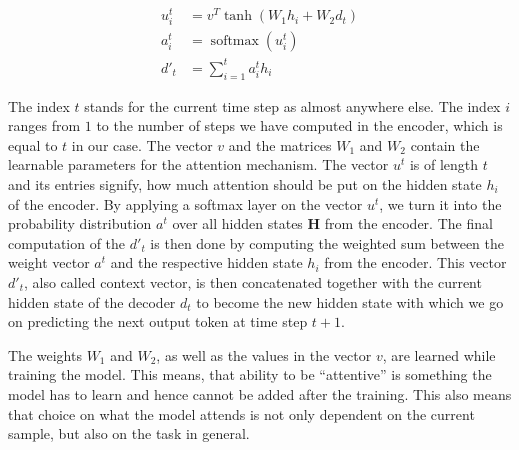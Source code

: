 \begin{equation}
\label{fundamentals:attention:equations}
\begin{split}
	u^t_i & = v^T \tanh(W_1 h_i + W_2 d_t) \\
	a^t_i & = \operatorname{softmax}(u^t_i) \\
	d'_t & = \sum_{i=1}^{t} a^t_i h_i
\end{split}
\end{equation}

The index $t$ stands for the current time step as almost anywhere else. The index $i$ ranges from $1$ to the number of steps we have computed in the encoder, which is equal to $t$ in our case. The vector $v$ and the matrices $W_1$ and $W_2$ contain the learnable parameters for the attention mechanism. The vector $u^t$ is of length $t$ and its entries signify, how much attention should be put on the hidden state $h_i$ of the encoder. By applying a softmax layer on the vector $u^t$, we turn it into the probability distribution $a^t$ over all hidden states $\mathbf{H}$ from the encoder. The final computation of the $d'_t$ is then done by computing the weighted sum between the weight vector $a^t$ and the respective hidden state $h_i$ from the encoder. This vector $d'_t$, also called context vector, is then concatenated together with the current hidden state of the decoder $d_t$ to become the new hidden state with which we go on predicting the next output token at time step $t+1$.

The weights $W_1$ and $W_2$, as well as the values in the vector $v$, are learned while training the model. This means, that ability to be ``attentive'' is something the model has to learn and hence cannot be added after the training. This also means that choice on what the model attends is not only dependent on the current sample, but also on the task in general.

